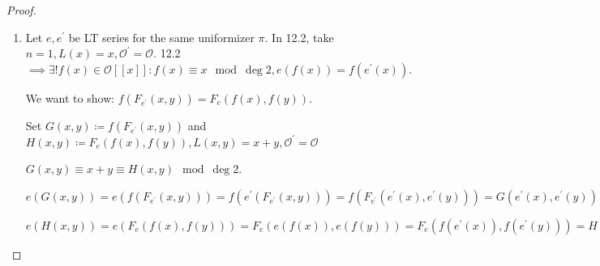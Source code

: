 \documentclass[openany]{amsbook}
\numberwithin{section}{chapter}
\theoremstyle{definition}
\newtheorem*{remark}{Remark}
\begin{document}
\begin{proof}
\begin{enumerate}[label=\roman*)]
\begin{enumerate}[label=\arabic*)]
            \item Similar. We apply 12.2.
            
            \item Similar. We apply 12.2 to the functions on the LHS and RHS of the identity in question.

        \end{enumerate} 

        Multiplication by \(\pi\) satisfies \(e([\pi]_e(x))=[\pi]_e(e(x))\) and \([\pi]_e(x) \equiv \pi x \mod\deg 2\).

        \(e(x)\) itself has both of these properties: \(e(e(x))=e(e(x))\) and \(e(x) \equiv \pi x \mod\deg 2\) 
        
        Therefore, Uniqueness (12.2) \(\impliedby [\pi]_e(x) = e(x)\).

        \begin{remark}
            If \(K = \mathbb{Q}_p, \pi = p\) then \(e(x) = (1+x)^p - 1\) is a Lubin-Tate series and in this case \(F_e = \widehat{G}_m\) is the formal multiplicative group by uniqueness with multiplication \([a]_{\widehat{G}_m (x) = (1+x)^a - 1}\).

            But we can also take \(e^{\prime} (x) px + x^p \implies\) there is a formal \(\mathbb{Z}_p\)-module \(F_e (x,y)\) such that \([p]_{F_e}(x) = px + x^p\).
        \end{remark}

        \item Let \(e,e^{\prime}\) be LT series for the same uniformizer \(\pi\). In 12.2, take \(n=1, L(x) = x, \mathcal{O} ^{\prime} = \mathcal{O}\). 12.2 \(\implies \exists ! f(x) \in \mathcal{O} [[x]]: f(x) \equiv x \mod\deg 2, e(f(x))=f(e^{\prime} (x))\).
        
        We want to show: \(f(F_{e^{\prime}}(x,y))=F_{e} (f(x),f(y))\).
        
        Set \(G(x,y)\coloneqq f(F_{e^{\prime}}(x,y))\) and \(H(x,y)\coloneqq F_{e}(f(x),f(y)), L(x,y) = x+y, \mathcal{O} ^{\prime}  = \mathcal{O}\) 
        
        \(G(x,y)\equiv x+y \equiv H(x,y) \mod\deg 2\).
        
        \(e(G(x,y))=e(f(F_{e^{\prime}}(x,y)))=f(e^{\prime}(F_{e^{\prime}}(x,y)))=f(F_{e^{\prime}}(e^{\prime}(x),e^{\prime}(y)))=G(e^{\prime}(x),e^{\prime}(y))\)

        \(e(H(x,y))=e(F_e(f(x),f(y)))=F_e(e(f(x)),e(f(y)))=F_e(f(e^{\prime} (x)),f(e^{\prime} (y)))=H(e^{\prime}(x),e^{\prime}(y))\)


\end{enumerate}
\end{proof}
\end{document}
